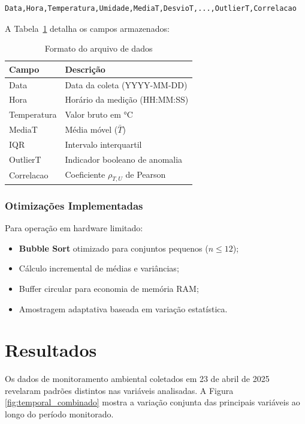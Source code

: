\documentclass[12pt, a4paper]{article}
\begin{document}
\begin{verbatim}
Data,Hora,Temperatura,Umidade,MediaT,DesvioT,...,OutlierT,Correlacao
\end{verbatim}

A Tabela~\ref{tab:formato_dados} detalha os campos armazenados:

\begin{table}[ht]
    \centering
    \caption{Formato do arquivo de dados}
    \label{tab:formato_dados}
    \begin{tabular}{|l|l|}
        \hline
        Campo & Descrição \\ \hline
        \hline
        Data & Data da coleta (YYYY-MM-DD) \\
        \hline
        Hora & Horário da medição (HH:MM:SS) \\
        \hline
        Temperatura & Valor bruto em °C \\
        \hline
        MediaT & Média móvel ($\bar{T}$) \\
        \hline
        IQR & Intervalo interquartil \\
        \hline
        OutlierT & Indicador booleano de anomalia \\
        \hline
        Correlacao & Coeficiente $\rho_{T,U}$ de Pearson \\ \hline
    \end{tabular}
\end{table}

\subsubsection{Otimizações Implementadas}
Para operação em hardware limitado:

\begin{itemize}
    \item \textbf{Bubble Sort} otimizado para conjuntos pequenos ($n \leq 12$);
    \item Cálculo incremental de médias e variâncias;
    \item Buffer circular para economia de memória RAM;
    \item Amostragem adaptativa baseada em variação estatística.
\end{itemize}

\section{Resultados}
\label{sec:resultados}

Os dados de monitoramento ambiental coletados em 23 de abril de 2025 revelaram padrões distintos nas variáveis analisadas. A Figura \ref{fig:temporal_combinado} mostra a variação conjunta das principais variáveis ao longo do período monitorado. 
\end{document}
